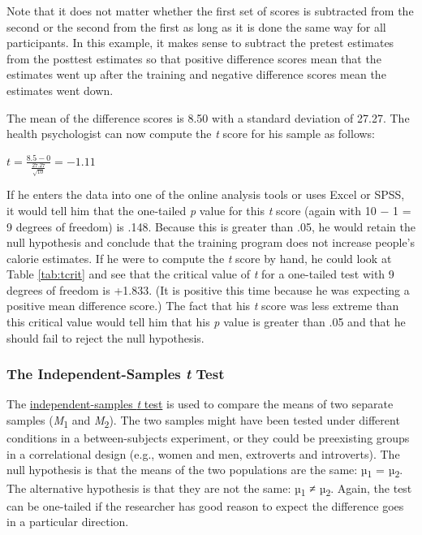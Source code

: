 \documentclass[
]{krantz}
\begin{document}
Note that it does not matter whether the first set of scores is subtracted from the second or the second from the first as long as it is done the same way for all participants. In this example, it makes sense to subtract the pretest estimates from the posttest estimates so that positive difference scores mean that the estimates went up after the training and negative difference scores mean the estimates went down.

The mean of the difference scores is 8.50 with a standard deviation of 27.27. The health psychologist can now compute the \emph{t} score for his sample as follows:

\(t=\frac{8.5-0}{\frac{27.27}{\sqrt{10}}}=-1.11\)

If he enters the data into one of the online analysis tools or uses Excel or SPSS, it would tell him that the one-tailed \emph{p} value for this \emph{t} score (again with 10 − 1 = 9 degrees of freedom) is .148. Because this is greater than .05, he would retain the null hypothesis and conclude that the training program does not increase people's calorie estimates. If he were to compute the \emph{t} score by hand, he could look at Table \ref{tab:tcrit} and see that the critical value of \emph{t} for a one-tailed test with 9 degrees of freedom is +1.833. (It is positive this time because he was expecting a positive mean difference score.) The fact that his \emph{t} score was less extreme than this critical value would tell him that his \emph{p} value is greater than .05 and that he should fail to reject the null hypothesis.

\subsubsection*{\texorpdfstring{The Independent-Samples \emph{t} Test}{The Independent-Samples t Test}}\label{the-independent-samples-t-test}


The \hyperref[independent-samples-t-test]{independent-samples \emph{t} test} is used to compare the means of two separate samples (\emph{M}\textsubscript{1} and \emph{M}\textsubscript{2}). The two samples might have been tested under different conditions in a between-subjects experiment, or they could be preexisting groups in a correlational design (e.g., women and men, extroverts and introverts). The null hypothesis is that the means of the two populations are the same: µ\textsubscript{1} = µ\textsubscript{2}. The alternative hypothesis is that they are not the same: µ\textsubscript{1} ≠ µ\textsubscript{2}. Again, the test can be one-tailed if the researcher has good reason to expect the difference goes in a particular direction.
\end{document}
